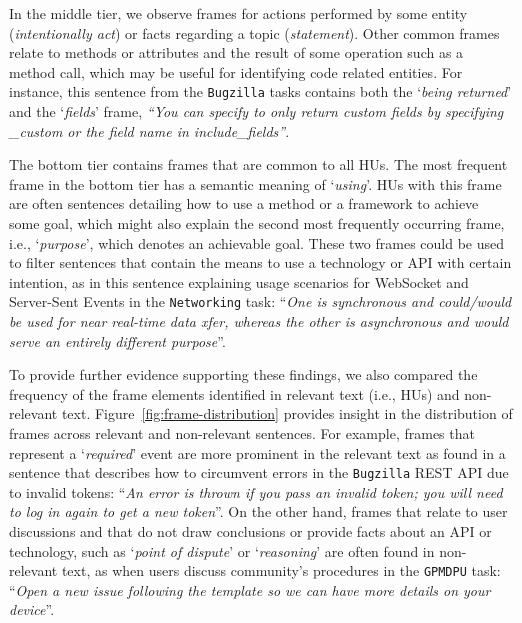 \afterpage{

}


In the middle tier, we observe frames for actions performed by some entity (\textit{intentionally act}) or facts regarding a topic (\textit{statement}).
Other common frames relate to methods or attributes and the result of some operation such as a method call, which may be useful for identifying code related entities.
For instance, this sentence from the \texttt{Bugzilla} tasks contains both the `\textit{being returned}' and the `\textit{fields}' frame, 
\textit{``You can specify to only return custom fields by specifying \_custom or the field name in include\_fields''}.



The bottom tier contains frames that are common to all HUs.
The most frequent frame in the bottom tier has a semantic meaning of `\textit{using}'.
HUs with this frame are often sentences detailing how to use a method or a
framework to achieve some goal, which might also explain the second most frequently occurring frame, i.e., `\textit{purpose}', which denotes an achievable goal. 
These two frames could be used to filter sentences that contain the means
to use a technology or API with certain intention, as in this sentence explaining usage scenarios for
WebSocket and Server-Sent Events in the \texttt{Networking} task:
``\textit{One is synchronous and could/would be used for near real-time data xfer, whereas the other is asynchronous and would serve an entirely different purpose}''.




To provide further evidence supporting these findings,
we also  compared the frequency of the frame elements identified in relevant text (i.e., HUs) and non-relevant text.
Figure~\ref{fig:frame-distribution} provides insight in the distribution of frames across relevant and non-relevant sentences.
For example, frames that represent a `\textit{required}' event
are more prominent in the relevant text
as found in a sentence that describes
how to circumvent errors in the \texttt{Bugzilla} REST API  due to invalid tokens:
``\textit{An error is thrown if you pass an invalid token; you will need to log in again to get a new token}''.
On the other hand, frames that relate to user discussions and that do not draw conclusions or provide 
facts about an API or technology, such as `\textit{point of dispute}' or `\textit{reasoning}' are often found in non-relevant text,
as when users discuss community's procedures in the \texttt{GPMDPU} task: ``\textit{Open a new issue following the template so we can have more details on your device}''. 


